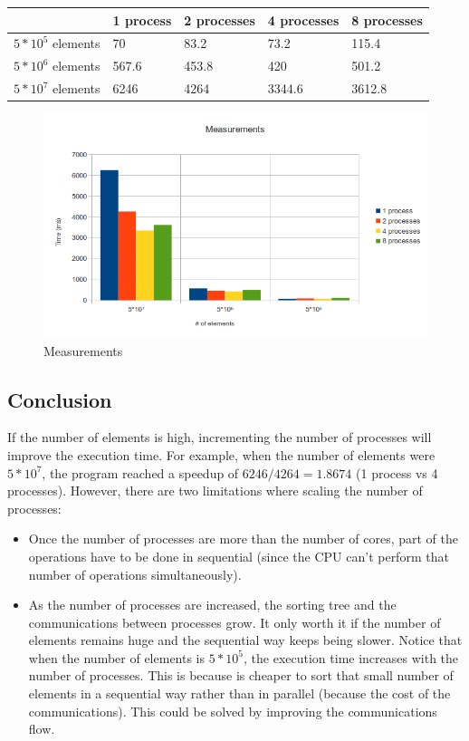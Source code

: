 \documentclass[a4paper,10pt]{article}
\begin{document}
  \begin{center}
\begin{tabular}{|l|l|l|l|l|}
\hline
& 1 process & 2 processes & 4 processes & 8 processes\\
\hline
$5*10^5$ elements & 70& 83.2 & 73.2 & 115.4\\
\hline
$5*10^6$ elements & 567.6 & 453.8 & 420 & 501.2\\
\hline
$5*10^7$ elements & 6246 & 4264 & 3344.6 & 3612.8\\
\hline
  \end{tabular}
  \end{center}
  
  \hspace{1.5cm}
    \begin{figure}[h]
  \begin{center}
  \includegraphics[scale=0.6]{measurements.png}
  \caption{Measurements}
  \end{center}
  \label{measurements}
\end{figure}
\hspace{1.5cm}

  \subsection{Conclusion}
  If the number of elements is high, incrementing the number of processes will improve the execution time. For example, when the number of elements were $5*10^7$, the program reached 
  a speedup of $6246/4264 = 1.8674$ (1 process vs 4 processes). However, there are two limitations where scaling the number of processes:
  \begin{itemize}
  \item Once the number of processes are more than the number of cores, part of the operations have to be done in sequential (since the CPU can't perform that number of operations simultaneously).
   \item As the number of processes are increased, the sorting tree and the communications between processes grow. It only worth it if the number of elements remains
    huge and the sequential way keeps being slower. Notice that when the number of elements is $5*10^5$, the execution time increases with the number of processes. This is because is cheaper to sort that small number of elements 
    in a sequential way rather than in parallel (because the cost of the communications). This could be solved by improving the communications flow.
   
  \end{itemize}
\end{document}
